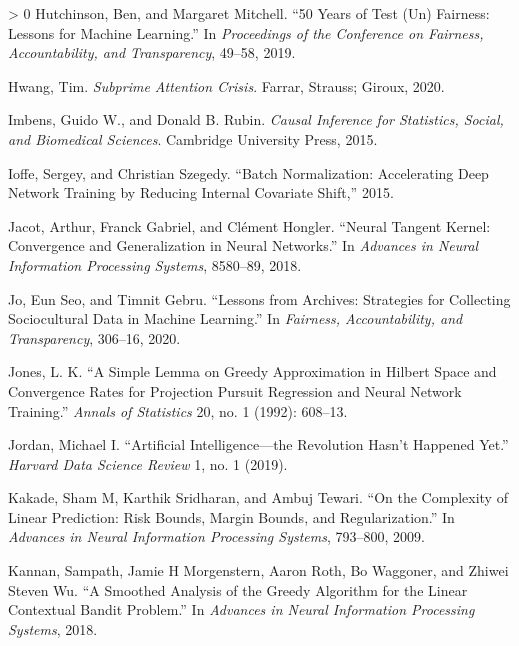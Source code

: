 \documentclass{tufte-book}
\newlength{\cslhangindent}
\newenvironment{CSLReferences}[3] %
 {%
  \setlength{\parindent}{0pt}
  \ifodd #1 \everypar{\setlength{\hangindent}{\cslhangindent}}\ignorespaces\fi
  \ifnum #2 > 0
  \setlength{\parskip}{#3\baselineskip}
  \fi
 }%
 {
 }
\begin{document}
\begin{CSLReferences}{1}{0}
\leavevmode\hypertarget{ref-hutchinson201950}{}%
Hutchinson, Ben, and Margaret Mitchell. {``50 Years of Test (Un)
Fairness: Lessons for Machine Learning.''} In \emph{Proceedings of the
Conference on Fairness, Accountability, and Transparency}, 49--58, 2019.

\leavevmode\hypertarget{ref-hwang2020subprime}{}%
Hwang, Tim. \emph{Subprime Attention Crisis}. Farrar, Strauss; Giroux,
2020.

\leavevmode\hypertarget{ref-imbens2015causal}{}%
Imbens, Guido W., and Donald B. Rubin. \emph{Causal Inference for
Statistics, Social, and Biomedical Sciences}. Cambridge University
Press, 2015.

\leavevmode\hypertarget{ref-ioffe2015batch}{}%
Ioffe, Sergey, and Christian Szegedy. {``Batch Normalization:
Accelerating Deep Network Training by Reducing Internal Covariate
Shift,''} 2015.

\leavevmode\hypertarget{ref-jacot2018neural}{}%
Jacot, Arthur, Franck Gabriel, and Clément Hongler. {``Neural Tangent
Kernel: Convergence and Generalization in Neural Networks.''} In
\emph{Advances in Neural Information Processing Systems}, 8580--89,
2018.

\leavevmode\hypertarget{ref-jo2020lessons}{}%
Jo, Eun Seo, and Timnit Gebru. {``Lessons from Archives: Strategies for
Collecting Sociocultural Data in Machine Learning.''} In \emph{Fairness,
Accountability, and Transparency}, 306--16, 2020.

\leavevmode\hypertarget{ref-Jones92}{}%
Jones, L. K. {``A Simple Lemma on Greedy Approximation in {H}ilbert
Space and Convergence Rates for Projection Pursuit Regression and Neural
Network Training.''} \emph{Annals of Statistics} 20, no. 1 (1992):
608--13.

\leavevmode\hypertarget{ref-jordan2019artificial}{}%
Jordan, Michael I. {``Artificial Intelligence---the Revolution Hasn't
Happened Yet.''} \emph{Harvard Data Science Review} 1, no. 1 (2019).

\leavevmode\hypertarget{ref-kakade2009complexity}{}%
Kakade, Sham M, Karthik Sridharan, and Ambuj Tewari. {``On the
Complexity of Linear Prediction: Risk Bounds, Margin Bounds, and
Regularization.''} In \emph{Advances in Neural Information Processing
Systems}, 793--800, 2009.

\leavevmode\hypertarget{ref-kannan2018smoothed}{}%
Kannan, Sampath, Jamie H Morgenstern, Aaron Roth, Bo Waggoner, and
Zhiwei Steven Wu. {``A Smoothed Analysis of the Greedy Algorithm for the
Linear Contextual Bandit Problem.''} In \emph{Advances in Neural
Information Processing Systems}, 2018.


\end{CSLReferences}
\end{document}
